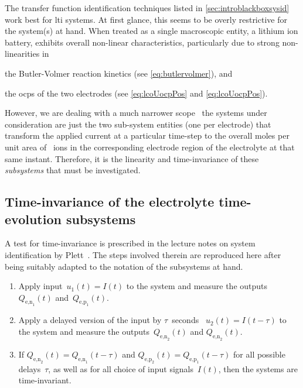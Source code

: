 

The      transfer     function      identification     techniques      listed
in \cref{sec:introblackboxsysid} work best for \gls{lti}  systems. At
first glance,  this seems to  be overly restrictive  for the system(s)  at hand.
When  treated  as  a  single  macroscopic  entity,  a  lithium  ion  battery,
exhibits  overall non-linear  characteristics,  particularly due  to strong
non-linearities in
\begin{enumerate*}[label=\emph{\alph*})]
    \item the Butler-Volmer reaction kinetics (see \cref{eq:butlervolmer}), and
    \item the \glspl{ocp} of the two electrodes (see \cref{eq:lcoUocpPos} and \cref{eq:lcoUocpPos}).
\end{enumerate*}
However,  we are  dealing with  a much  narrower scope  \ie~the  systems under
consideration  are just  the two  sub-system entities  (one per  electrode) that
transform the  applied current at  a particular  time-step to the  overall moles
per  unit area  of  ~ions in  the  corresponding  electrode region  of
the  electrolyte at  that  same  instant. Therefore,  it  is  the linearity  and
time-invariance of these \emph{subsystems} that must be investigated.

\subsection{Time-invariance of the electrolyte time-evolution subsystems}\label{subsec:timeinvariance}
A  test  for time-invariance  is  prescribed  in  the  lecture notes  on  system
identification by  Plett~\cite{PlettECE5560_02}. The steps involved  therein are
reproduced here after  being suitably adapted to the notation  of the subsystems
at hand.
\begin{enumerate}
    \item Apply input~${u_1(t) = I(t)}$ to the system and measure the outputs~$Q_{\text{e,n}_1}\!(t)$ and~$Q_{\text{e,p}_1}\!(t)$.
    \item Apply a delayed version of the input by $\tau$~seconds \ie~${u_2(t) = I(t-\tau)}$ to the system and measure the outputs~$Q_{\text{e,n}_2}\!(t)$ and $Q_{\text{e,n}_2}\!(t)$.
    \item If ${Q_{\text{e,n}_2}\!(t) = Q_{\text{e,n}_1}\!(t-\tau)}$ and
        ${Q_{\text{e,p}_2}\!(t) = Q_{\text{e,p}_1}\!(t-\tau)}$ for all possible
        delays~$\tau$, as well as for all choice of input signals~$I(t)$, then the systems are time-invariant.
\end{enumerate}

